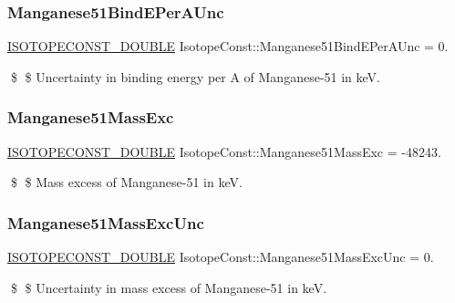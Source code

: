 \subsubsection{\texorpdfstring{Manganese51\+Bind\+E\+Per\+A\+Unc}{Manganese51BindEPerAUnc}}
{\footnotesize\ttfamily \mbox{\hyperlink{group___isotope_const-_macros_ga8f45a7272ce02c0b4c65c44636ed719a}{I\+S\+O\+T\+O\+P\+E\+C\+O\+N\+S\+T\+\_\+\+D\+O\+U\+B\+LE}} Isotope\+Const\+::\+Manganese51\+Bind\+E\+Per\+A\+Unc = 0.}

\$ \$ Uncertainty in binding energy per A of Manganese-\/51 in keV. \mbox{\label{group___isotope_const-_manganese-_mn51_ga4a930b5cb6e5b44091f55799706f837b}} 
\subsubsection{\texorpdfstring{Manganese51\+Mass\+Exc}{Manganese51MassExc}}
{\footnotesize\ttfamily \mbox{\hyperlink{group___isotope_const-_macros_ga8f45a7272ce02c0b4c65c44636ed719a}{I\+S\+O\+T\+O\+P\+E\+C\+O\+N\+S\+T\+\_\+\+D\+O\+U\+B\+LE}} Isotope\+Const\+::\+Manganese51\+Mass\+Exc = -\/48243.}

\$ \$ Mass excess of Manganese-\/51 in keV. \mbox{\label{group___isotope_const-_manganese-_mn51_ga470428973d3c4a485dc0f904225ce4e0}} 
\subsubsection{\texorpdfstring{Manganese51\+Mass\+Exc\+Unc}{Manganese51MassExcUnc}}
{\footnotesize\ttfamily \mbox{\hyperlink{group___isotope_const-_macros_ga8f45a7272ce02c0b4c65c44636ed719a}{I\+S\+O\+T\+O\+P\+E\+C\+O\+N\+S\+T\+\_\+\+D\+O\+U\+B\+LE}} Isotope\+Const\+::\+Manganese51\+Mass\+Exc\+Unc = 0.}

\$ \$ Uncertainty in mass excess of Manganese-\/51 in keV. \mbox{\label{group___isotope_const-_manganese-_mn51_gae38b16f890425860be90b4a5c22bba32}} 
